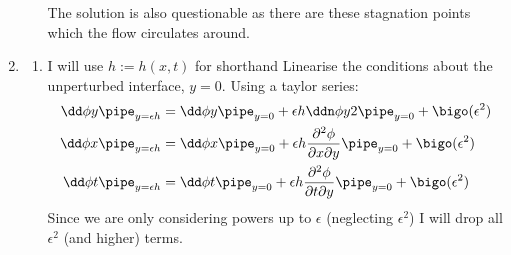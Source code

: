 \documentclass{/home/janmebows/Documents/LatexTemplates/myassignment}
\begin{document}
\begin{enumerate}
\begin{enumerate}
        The solution is also questionable as there are these stagnation points which the flow circulates around. 
        
    \end{enumerate}













    \item %
    \begin{enumerate}
        \item %
        I will use $h := h(x,t)$ for shorthand
        Linearise the conditions about the unperturbed interface, $y=0$. Using a taylor series:
        \begin{align*}
            \dd\phi y\pipe_{y=\epsilon h} &= \dd\phi y\pipe_{y=0} + \epsilon h\ddn \phi y2 \pipe_{y=0} + \bigo(\epsilon^2)\\
            \dd\phi x\pipe_{y=\epsilon h} &= \dd\phi x \pipe_{y=0} + \epsilon h \frac{\partial^2 \phi}{\partial x \partial y}\pipe_{y=0} + \bigo(\epsilon^2)\\
            \dd\phi t\pipe_{y=\epsilon h} &= \dd\phi t \pipe_{y=0} + \epsilon h \frac{\partial^2 \phi}{\partial t \partial y}\pipe_{y=0} + \bigo(\epsilon^2)
        \end{align*}
        Since we are only considering powers up to $\epsilon$ (neglecting $\epsilon^2$) I will drop all $\epsilon^2$ (and higher) terms. 


\end{enumerate}
\end{enumerate}
\end{document}
